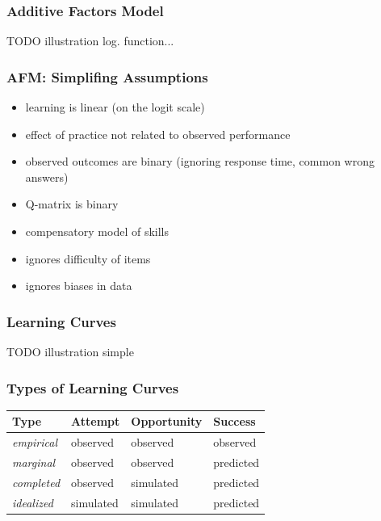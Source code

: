 \documentclass[bigger]{beamer}
\begin{document}
\begin{frame}
  \frametitle{Additive Factors Model}

  TODO illustration log. function...
\end{frame}

\begin{frame}
  \frametitle{AFM: Simplifing Assumptions}

  \begin{itemize}
  \item learning is linear (on the logit scale)
  \item effect of practice not related to observed performance
  \item observed outcomes are binary (ignoring response time, common wrong
    answers)
  \item Q-matrix is binary
  \item compensatory model of skills
  \item ignores difficulty of items
  \item ignores biases in data
  \end{itemize}
\end{frame}

\begin{frame}
  \frametitle{Learning Curves}

  TODO illustration simple
\end{frame}

\begin{frame}
  \frametitle{Types of Learning Curves}

  \begin{center}
  \begin{tabular}{llll}
    \toprule
    Type & Attempt & Opportunity & Success\\
    \midrule
    {\it empirical} & observed  & observed  & observed\\
    {\it marginal}  & observed  & observed  & predicted\\
    {\it completed} & observed  & simulated & predicted\\
    {\it idealized} & simulated & simulated & predicted\\
    \bottomrule
  \end{tabular}    
  \end{center}
\end{frame}
\end{document}
